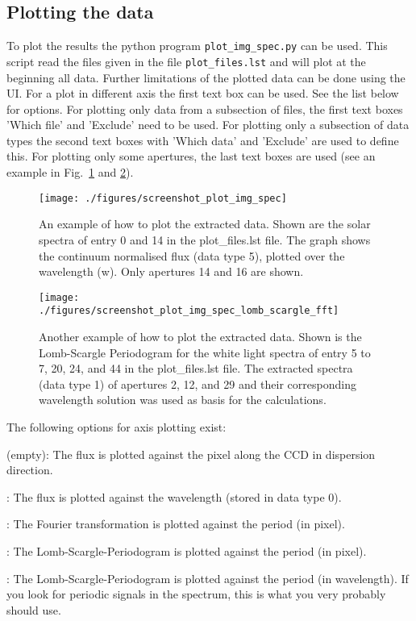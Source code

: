 \documentclass[10pt,a4paper]{article}
\begin{document}
\subsection{Plotting the data}

To plot the results the python program \verb|plot_img_spec.py| can be used. This script read the files given in the file \verb|plot_files.lst| and will plot at the beginning all data. Further limitations of the plotted data can be done using the UI. For a plot in different axis the first text box can be used. See the list below for options. For plotting only data from a subsection of files, the first text boxes 'Which file' and 'Exclude' need to be used. For plotting only a subsection of data types the second text boxes with 'Which data' and 'Exclude' are used to define this. For plotting only some apertures, the last text boxes are used (see an example in Fig.~\ref{figure_plotting_results_example1} and \ref{figure_plotting_results_example2}).

\begin{figure} 
  \begin{center}
    \texttt{[image: ./figures/screenshot\_plot\_img\_spec]}
  \end{center} 
  \caption{An example of how to plot the extracted data. Shown are the solar spectra of entry 0 and 14 in the plot\_files.lst file. The graph shows the continuum normalised flux (data type 5), plotted over the wavelength (w). Only apertures 14 and 16 are shown.
    \label{figure_plotting_results_example1}}
\end{figure}

\begin{figure} 
  \begin{center}
    \texttt{[image: ./figures/screenshot\_plot\_img\_spec\_lomb\_scargle\_fft]}
  \end{center} 
  \caption{Another example of how to plot the extracted data. Shown is the Lomb-Scargle Periodogram for the white light spectra of entry 5 to 7, 20, 24, and 44 in the plot\_files.lst file. The extracted spectra (data type 1) of apertures 2, 12, and 29 and their corresponding wavelength solution was used as basis for the calculations.
    \label{figure_plotting_results_example2}}
\end{figure}

The following options for axis plotting exist:
\begin{description}\setlength\itemsep{0em}
  \item [] (empty): The flux is plotted against the pixel along the CCD in dispersion direction.
  \item [w] : The flux is plotted against the wavelength (stored in data type 0).
  \item [f] : The Fourier transformation is plotted against the period (in pixel). 
  \item [l] : The Lomb-Scargle-Periodogram is plotted against the period (in pixel).
  \item [wl] : The Lomb-Scargle-Periodogram is plotted against the period (in wavelength). If you look for periodic signals in the spectrum, this is what you very probably should use. 
\end{description}
\end{document}
